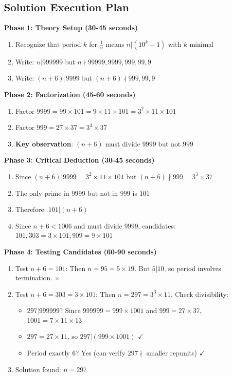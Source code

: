 \documentclass[11pt]{article}
\begin{document}
\begin{roadmapbox}
\subsection*{Solution Execution Plan}

\textbf{Phase 1: Theory Setup (30-45 seconds)}
\begin{enumerate}[leftmargin=*]
    \item Recognize that period $k$ for $\frac{1}{n}$ means $n | (10^k - 1)$ with $k$ minimal
    \item Write: $n | 999999$ but $n \nmid 99999, 9999, 999, 99, 9$
    \item Write: $(n+6) | 9999$ but $(n+6) \nmid 999, 99, 9$
\end{enumerate}

\textbf{Phase 2: Factorization (45-60 seconds)}
\begin{enumerate}[leftmargin=*]
    \item Factor $9999 = 99 \times 101 = 9 \times 11 \times 101 = 3^2 \times 11 \times 101$
    \item Factor $999 = 27 \times 37 = 3^3 \times 37$
    \item \textbf{Key observation}: $(n+6)$ must divide $9999$ but not $999$
\end{enumerate}

\textbf{Phase 3: Critical Deduction (30-45 seconds)}
\begin{enumerate}[leftmargin=*]
    \item Since $(n+6) | 9999 = 3^2 \times 11 \times 101$ but $(n+6) \nmid 999 = 3^3 \times 37$
    \item The only prime in $9999$ but not in $999$ is $\boxed{101}$
    \item Therefore: $101 | (n+6)$
    \item Since $n+6 < 1006$ and must divide $9999$, candidates: $101, 303 = 3 \times 101, 909 = 9 \times 101$
\end{enumerate}

\textbf{Phase 4: Testing Candidates (60-90 seconds)}
\begin{enumerate}[leftmargin=*]
    \item Test $n+6 = 101$: Then $n = 95 = 5 \times 19$. But $5 | 10$, so period involves termination. $\times$
    \item Test $n+6 = 303 = 3 \times 101$: Then $n = 297 = 3^3 \times 11$. Check divisibility:
    \begin{itemize}
        \item $297 | 999999$? Since $999999 = 999 \times 1001$ and $999 = 27 \times 37$, $1001 = 7 \times 11 \times 13$
        \item $297 = 27 \times 11$, so $297 | (999 \times 1001)$ $\checkmark$
        \item Period exactly 6? Yes (can verify $297 \nmid$ smaller repunits) $\checkmark$
    \end{itemize}
    \item Solution found: $n = 297$
\end{enumerate}


\end{roadmapbox}
\end{document}

